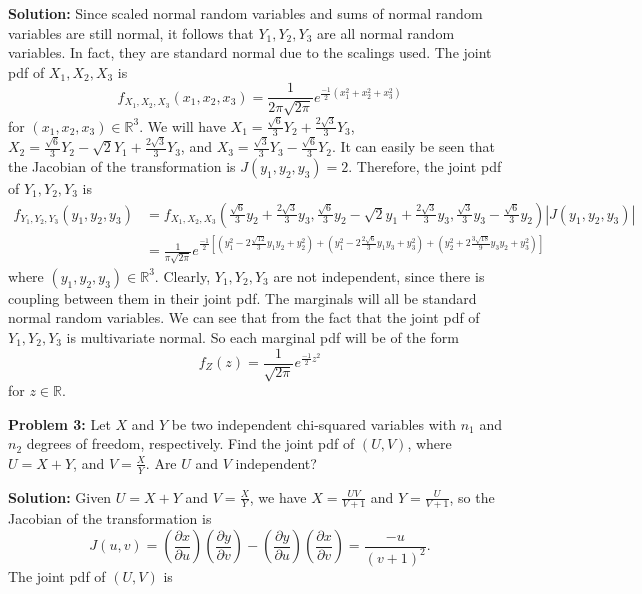 \documentclass{article}
\newcommand{\mybox}{%
    \collectbox{%
        \setlength{\fboxsep}{1pt}%
        \fbox{\BOXCONTENT}%
    }%
}
\begin{document}
\noindent\mybox{\textbf{Solution:}}  Since scaled normal random variables and sums of normal random variables are still normal, it follows that $Y_1, Y_2, Y_3$ are all normal random variables.  In fact, they are standard normal due to the scalings used.  The joint pdf of $X_1, X_2, X_3$ is 
$$
f_{X_1,X_2,X_3}(x_1,x_2,x_3) = \frac{1}{2\pi\sqrt{2\pi}}e^{\frac{-1}{2}(x_1^2 + x_2^2 + x_3^2)}
$$
\noindent for $(x_1,x_2,x_3) \in \mathbb{R}^3$.  We will have $X_1 = \frac{\sqrt{6}}{3}Y_2 + \frac{2\sqrt{3}}{3}Y_3$, $X_2 = \frac{\sqrt{6}}{3}Y_2 -\sqrt{2}Y_1 +\frac{2\sqrt{3}}{3}Y_3$, and $X_3 = \frac{\sqrt{3}}{3}Y_3 - \frac{\sqrt{6}}{3}Y_2$.  It can easily be seen that the Jacobian of the transformation is $J(y_1,y_2,y_3) = 2$.  Therefore, the joint pdf of $Y_1, Y_2, Y_3$ is 
\begin{align*}
f_{Y_1,Y_2,Y_3}(y_1,y_2,y_3) &= f_{X_1,X_2,X_3}\left(\frac{\sqrt{6}}{3}y_2 + \frac{2\sqrt{3}}{3}y_3,\frac{\sqrt{6}}{3}y_2 -\sqrt{2}y_1 +\frac{2\sqrt{3}}{3}y_3,\frac{\sqrt{3}}{3}y_3 - \frac{\sqrt{6}}{3}y_2 \right)|J(y_1,y_2,y_3)| \\
&= \frac{1}{\pi\sqrt{2\pi}}e^{\frac{-1}{2}\left[\left(y_1^2-2\frac{\sqrt{12}}{3}y_1y_2+y_2^2\right)+\left(y_1^2-2\frac{2\sqrt{6}}{3}y_1y_3+y_3^2\right)+\left(y_2^2+2\frac{3\sqrt{18}}{9}y_3y_2+y_3^2\right)\right]}
\end{align*}
\noindent where $(y_1,y_2,y_3)\in \mathbb{R}^3$.  Clearly, $Y_1, Y_2, Y_3$ are not independent, since there is coupling between them in their joint pdf.  The marginals will all be standard normal random variables.  We can see that from the fact that the joint pdf of $Y_1, Y_2, Y_3$ is multivariate normal.  So each marginal pdf will be of the form $$f_Z(z) = \frac{1}{\sqrt{2\pi}}e^{\frac{-1}{2}z^2}  $$for $z \in \mathbb{R}$.  


\pagebreak

\noindent\mybox{\textbf{Problem 3:}}  Let $X$ and $Y$ be two independent chi-squared variables with $n_1$ and $n_2$ degrees of freedom, respectively.  Find the joint pdf of $(U,V)$, where $U = X+Y$, and $V = \frac{X}{Y}$.  Are $U$ and $V$ independent?  

\vspace{5mm}

\noindent\mybox{\textbf{Solution:}}  Given $U = X + Y$ and $V = \frac{X}{Y}$, we have $X = \frac{UV}{V+1}$ and $Y = \frac{U}{V+1}$, so the Jacobian of the transformation is $$J(u,v) = \left(\frac{\partial x}{\partial u}\right)\left(\frac{\partial y}{\partial v}\right) - \left(\frac{\partial y}{\partial u}\right)\left(\frac{\partial x}{\partial v}\right) = \frac{-u}{(v+1)^2}.$$  The joint pdf of $(U,V)$ is 
\end{document}
